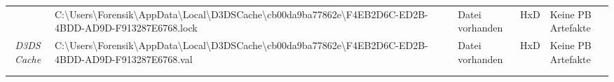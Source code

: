 \begin{appendices}
{\begin{landscape}
\begin{table}[h!]
{\begin{tabular}{cllll}
		\multicolumn{1}{|c|}{}                                                        & \multicolumn{1}{l|}{\cellcolor[HTML]{FE0000}C:\textbackslash{}Users\textbackslash{}Forensik\textbackslash{}AppData\textbackslash{}Local\textbackslash{}D3DSCache\textbackslash{}cb00da9ba77862e\textbackslash{}F4EB2D6C-ED2B-4BDD-AD9D-F913287E6768.lock}                                                                                                                       & \multicolumn{1}{l|}{\cellcolor[HTML]{009901}Datei vorhanden}                                      & \multicolumn{1}{l|}{HxD}                                   & \multicolumn{1}{l|}{\cellcolor[HTML]{F8A102}Keine PB Artefakte} \\ \cline{2-5} 
		\multicolumn{1}{|c|}{\multirow{-3}{*}{\textit{D3DS Cache}}}                   & \multicolumn{1}{l|}{\cellcolor[HTML]{FE0000}C:\textbackslash{}Users\textbackslash{}Forensik\textbackslash{}AppData\textbackslash{}Local\textbackslash{}D3DSCache\textbackslash{}cb00da9ba77862e\textbackslash{}F4EB2D6C-ED2B-4BDD-AD9D-F913287E6768.val}                                                                                                                        & \multicolumn{1}{l|}{\cellcolor[HTML]{009901}Datei vorhanden}                                      & \multicolumn{1}{l|}{HxD}                                   & \multicolumn{1}{l|}{\cellcolor[HTML]{F8A102}Keine PB Artefakte} \\ \hline
		\multicolumn{1}{l}{}                                                          &                                                                                                                                                                                                                                                                                                                                                                                 &                                                                                                   &                                                            &                                                                 \\
		\multicolumn{1}{l}{}                                                          &                                                                                                                                                                                                                                                                                                                                                                                 &                                                                                                   &                                                            &                                                                 \\

\end{tabular}}
\end{table}
\end{landscape}}
\end{appendices}

